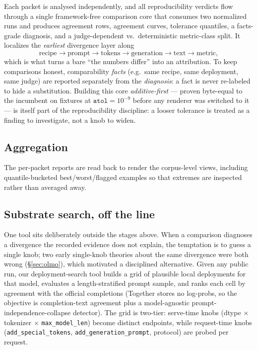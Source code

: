 Each packet is analysed independently, and all reproducibility verdicts flow
through a single framework-free comparison core
that consumes two normalized runs and produces agreement rows, agreement curves,
tolerance quantiles, a facts-grade diagnosis, and a judge-dependent vs.\
deterministic metric-class split. It localizes the \emph{earliest} divergence
layer along
\[
\text{recipe} \rightarrow \text{prompt} \rightarrow \text{tokens} \rightarrow
\text{generation} \rightarrow \text{text} \rightarrow \text{metric},
\]
which is what turns a bare ``the numbers differ'' into an attribution. To keep
comparisons honest, comparability \emph{facts} (e.g.\ same recipe, same
deployment, same judge) are reported separately from the \emph{diagnosis}: a fact
is never re-labeled to hide a substitution. Building this core
\emph{additive-first} --- proven byte-equal to the incumbent on fixtures at
$\texttt{atol}=10^{-9}$ before any renderer was switched to it --- is itself part of
the reproducibility discipline: a looser tolerance is treated as a finding to
investigate, not a knob to widen.

\subsection{Aggregation}
\label{sec:aggregation}

The per-packet reports are read back to render the corpus-level views, including
quantile-bucketed best/worst/flagged examples so that extremes are inspected
rather than averaged away.

\subsection{Substrate search, off the line}
\label{sec:deploymatch}

One tool sits deliberately outside the stages above. When a comparison diagnoses a
divergence
the recorded evidence does not explain, the temptation is to guess a single knob;
two early single-knob theories about the same divergence were both wrong
(\S\ref{sec:olmo}), which motivated a disciplined alternative. Given any public
run, our deployment-search tool builds a grid of plausible local deployments for
that model, evaluates a length-stratified prompt sample, and ranks each cell by
agreement with the official completions (Together stores no log-probs, so the
objective is completion-text agreement plus a model-agnostic
prompt-independence-collapse detector). The grid is two-tier: serve-time knobs
(dtype $\times$ tokenizer $\times$ \texttt{max\_model\_len}) become distinct
endpoints, while request-time knobs (\texttt{add\_special\_tokens},
\texttt{add\_generation\_prompt}, protocol) are probed per request.

